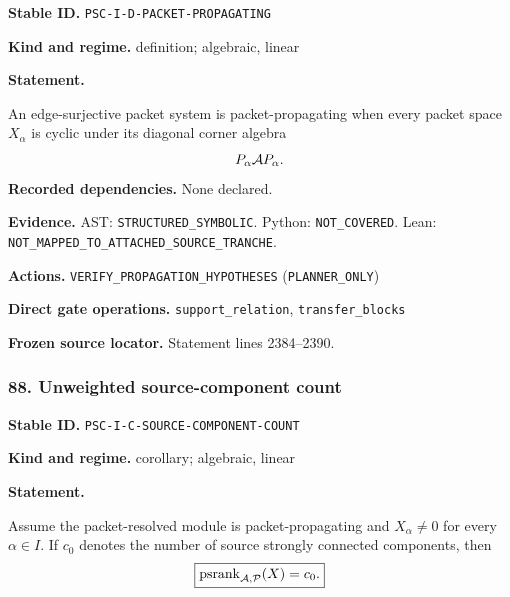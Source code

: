 \documentclass[a4paper,11pt]{article}
\newcommand{\field}[2]{\noindent\textbf{#1.} #2\par}
\begin{document}
\label{rec:PSC-I-D-PACKET-PROPAGATING}
\field{Stable ID}{\nolinkurl{PSC-I-D-PACKET-PROPAGATING}}
\field{Kind and regime}{definition; algebraic, linear}
\textbf{Statement.}\par
An edge-surjective packet system is packet-propagating when every packet space $X_\alpha$ is cyclic under its diagonal corner algebra
\[
P_\alpha\mathcal A P_\alpha.
\]
\field{Recorded dependencies}{None declared.}
\field{Evidence}{AST: \nolinkurl{STRUCTURED_SYMBOLIC}. Python: \nolinkurl{NOT_COVERED}. Lean: \nolinkurl{NOT_MAPPED_TO_ATTACHED_SOURCE_TRANCHE}.}
\field{Actions}{\nolinkurl{VERIFY_PROPAGATION_HYPOTHESES} (\nolinkurl{PLANNER_ONLY})}
\field{Direct gate operations}{\nolinkurl{support_relation}, \nolinkurl{transfer_blocks}}
\field{Frozen source locator}{Statement lines 2384--2390.}
\subsubsection*{88. Unweighted source-component count}
\label{rec:PSC-I-C-SOURCE-COMPONENT-COUNT}
\field{Stable ID}{\nolinkurl{PSC-I-C-SOURCE-COMPONENT-COUNT}}
\field{Kind and regime}{corollary; algebraic, linear}
\textbf{Statement.}\par
Assume the packet-resolved module is packet-propagating and $X_\alpha\neq0$ for every $\alpha\in I$.  If $c_0$ denotes the number of source strongly connected components, then
\[
\boxed{
\operatorname{psrank}_{\mathcal A,\mathcal P}(X)=c_0.
}
\]
\end{document}
